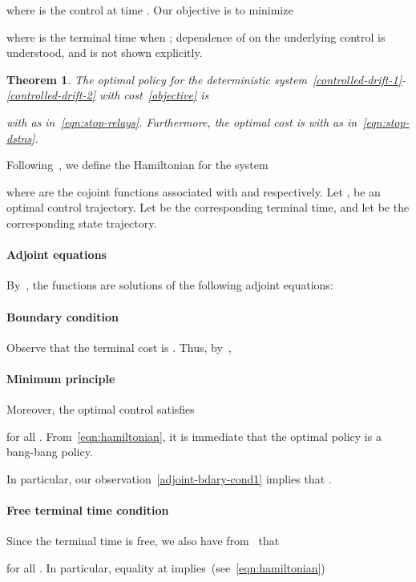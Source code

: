 \documentclass[10pt,journal,letterpaper]{IEEEtran}
\newtheorem{theorem}{Theorem}[section]
\begin{document}
where  is the control at time . Our objective is to minimize

where  is the terminal time when ; dependence of  on the underlying control is understood, and
is not shown explicitly. 
\begin{theorem}
The optimal policy for the deterministic system~\eqref{controlled-drift-1}-\eqref{controlled-drift-2} with cost~\eqref{objective} 
is 

with  as in~\eqref{eqn:stop-relays}.
Furthermore, the optimal cost is  with   as in~\eqref{eqn:stop-dstns}.
\end{theorem}
\begin{IEEEproof}
Following~\cite[Section~3.3.1]{stochctrl.bertsekas05dpoc-vol1}, we define the Hamiltonian for the system

where  are the cojoint functions
associated with  and  respectively.
Let , be an optimal control trajectory.
Let  be the corresponding terminal time, and let 
be the  corresponding state trajectory.
\paragraph{Adjoint equations}
By~\cite[Section~3.3.1, Proposition~3.1]{stochctrl.bertsekas05dpoc-vol1},
the functions  are
solutions of the following adjoint equations:

\paragraph{Boundary condition} 
Observe that the terminal cost is .
Thus, by~\cite[Section~3.3.1, Proposition~3.1]{stochctrl.bertsekas05dpoc-vol1},

\paragraph{Minimum principle} Moreover, the optimal control  satisfies

for all . From~\eqref{eqn:hamiltonian}, it is
immediate that the optimal policy is a bang-bang policy.

In particular, our observation~\eqref{adjoint-bdary-cond1} implies that
. 
\paragraph{Free terminal time condition}
Since the terminal time is free, we also
have from~\cite[Section~3.4.3]{stochctrl.bertsekas05dpoc-vol1} that

for all . In particular, equality at  implies~(see~\eqref{eqn:hamiltonian})


\end{IEEEproof}
\end{document}
